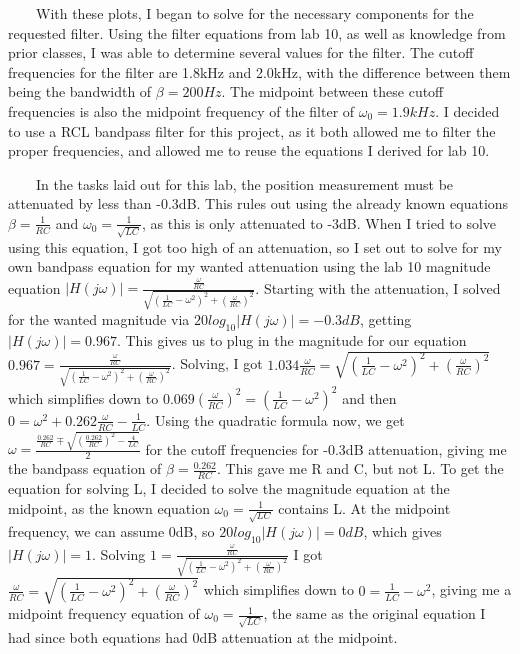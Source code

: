 \documentclass[11pt,a4]{article}
\begin{document}
\ \ \ \ With these plots, I began to solve for the necessary components for the requested filter. Using the filter equations from lab 10, as well as knowledge from prior classes, I was able to determine several values for the filter. The cutoff frequencies for the filter are 1.8kHz and 2.0kHz, with the difference between them being the bandwidth of $\beta = 200Hz$. The midpoint between these cutoff frequencies is also the midpoint frequency of the filter of $\omega_0 = 1.9kHz$. I decided to use a RCL bandpass filter for this project, as it both allowed me to filter the proper frequencies, and allowed me to reuse the equations I derived for lab 10.

\ \ \ \ In the tasks laid out for this lab, the position measurement must be attenuated by less than -0.3dB. This rules out using the already known equations $\beta = \frac{1}{RC}$ and $\omega_0 = \frac{1}{\sqrt{LC}}$, as this is only attenuated to -3dB. When I tried to solve using this equation, I got too high of an attenuation, so I set out to solve for my own bandpass equation for my wanted attenuation using the lab 10 magnitude equation $|H(j\omega)| = \frac{\frac{\omega}{RC}}{\sqrt{(\frac{1}{LC}-\omega^2)^2+(\frac{\omega}{RC})^2}}$. Starting with the attenuation, I solved for the wanted magnitude via $20log_{10}|H(j\omega)| = -0.3dB$, getting $|H(j\omega)| = 0.967$. This gives us to plug in the magnitude for our equation $0.967 = \frac{\frac{\omega}{RC}}{\sqrt{(\frac{1}{LC}-\omega^2)^2+(\frac{\omega}{RC})^2}}$. Solving, I got $1.034\frac{\omega}{RC} = \sqrt{(\frac{1}{LC}-\omega^2)^2+(\frac{\omega}{RC})^2}$ which simplifies down to $0.069(\frac{\omega}{RC})^2 = (\frac{1}{LC}-\omega^2)^2$ and then $0 = \omega^2 + 0.262\frac{\omega}{RC} - \frac{1}{LC}$. Using the quadratic formula now, we get $\omega = \frac{\frac{0.262}{RC} \mp \sqrt{(\frac{0.262}{RC})^2 - \frac{4}{LC}}}{2}$ for the cutoff frequencies for -0.3dB attenuation, giving me the bandpass equation of $\beta = \frac{0.262}{RC}$. This gave me R and C, but not L. To get the equation for solving L, I decided to solve the magnitude equation at the midpoint, as the known equation $\omega_0 = \frac{1}{\sqrt{LC}}$ contains L. At the midpoint frequency, we can assume 0dB, so $20log_{10}|H(j\omega)| = 0dB$, which gives $|H(j\omega)| = 1$. Solving $1 = \frac{\frac{\omega}{RC}}{\sqrt{(\frac{1}{LC}-\omega^2)^2+(\frac{\omega}{RC})^2}}$ I got $\frac{\omega}{RC} = \sqrt{(\frac{1}{LC}-\omega^2)^2+(\frac{\omega}{RC})^2}$ which simplifies down to $0 = \frac{1}{LC}-\omega^2$, giving me a midpoint frequency equation of $\omega_0 = \frac{1}{\sqrt{LC}}$, the same as the original equation I had since both equations had 0dB attenuation at the midpoint.
\end{document}
